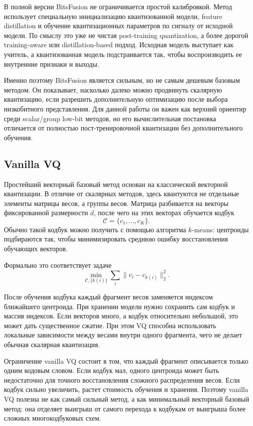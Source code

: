 \documentclass[a4paper,12pt]{article}
\begin{document}
В полной версии BitsFusion не ограничивается простой калибровкой. Метод использует специальную инициализацию квантизованной модели, feature distillation и обучение квантизационных параметров по сигналу от исходной модели. По смыслу это уже не чистая post-training quantization, а более дорогой training-aware или distillation-based подход. Исходная модель выступает как учитель, а квантизованная модель подстраивается так, чтобы воспроизводить ее внутренние признаки и выходы.

Именно поэтому BitsFusion является сильным, но не самым дешевым базовым методом. Он показывает, насколько далеко можно продвинуть скалярную квантизацию, если разрешить дополнительную оптимизацию после выбора низкобитного представления. Для данной работы он важен как верхний ориентир среди scalar/group low-bit методов, но его вычислительная постановка отличается от полностью пост-тренировочной квантизации без дополнительного обучения.

\subsection{Vanilla VQ}

Простейший векторный базовый метод основан на классической векторной квантизации. В отличие от скалярных методов, здесь квантуются не отдельные элементы матрицы весов, а группы весов. Матрица разбивается на векторы фиксированной размерности $d$, после чего на этих векторах обучается кодбук
\[
    \mathcal{C} = \{c_1, \ldots, c_K\}.
\]
Обычно такой кодбук можно получить с помощью алгоритма $k$-means: центроиды подбираются так, чтобы минимизировать среднюю ошибку восстановления обучающих векторов.

Формально это соответствует задаче
\[
    \min_{\mathcal{C}, \{k(i)\}}
    \sum_i \|v_i - c_{k(i)}\|_2^2.
\]

После обучения кодбука каждый фрагмент весов заменяется индексом ближайшего центроида. При хранении модели нужно сохранить сам кодбук и массив индексов. Если векторов много, а кодбук относительно небольшой, это может дать существенное сжатие. При этом VQ способна использовать локальные зависимости между весами внутри одного фрагмента, чего не делает обычная скалярная квантизация.

Ограничение vanilla VQ состоит в том, что каждый фрагмент описывается только одним кодовым словом. Если кодбук мал, одного центроида может быть недостаточно для точного восстановления сложного распределения весов. Если кодбук сильно увеличить, растет стоимость обучения и хранения. Поэтому vanilla VQ полезна не как самый сильный метод, а как минимальный векторный базовый метод: она отделяет выигрыш от самого перехода к кодбукам от выигрыша более сложных многокодбуковых схем.
\end{document}
